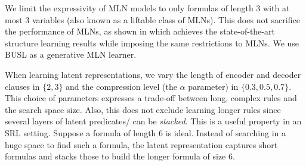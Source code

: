  We limit the expressivity of MLN models to only formulas of length 3 with at most 3 variables (also known as a liftable class of MLNs).
This does not sacrifice the performance of MLNs, as shown in \cite{VanHaaren2016} which achieves the state-of-the-art structure learning results while imposing the same restrictions to MLNs.
We use BUSL \cite{mihalkova:icml07} as a generative MLN learner.





When learning latent representations, we vary the length of encoder and decoder clauses in $\{2,3\}$ and the compression level (the $\alpha$ parameter) in $\{0.3, 0.5, 0.7\}$.
This choice of parameters expresses a trade-off between long, complex rules and the search space size.
Also, this does not exclude learning longer rules since several layers of latent predicates/ can be \textit{stacked}.
This is a useful property in an SRL setting.
Suppose a formula of length 6 is ideal.
Instead of searching in a huge space to find such a formula, the latent representation captures short formulas and stacks those to build the longer formula of size 6.




